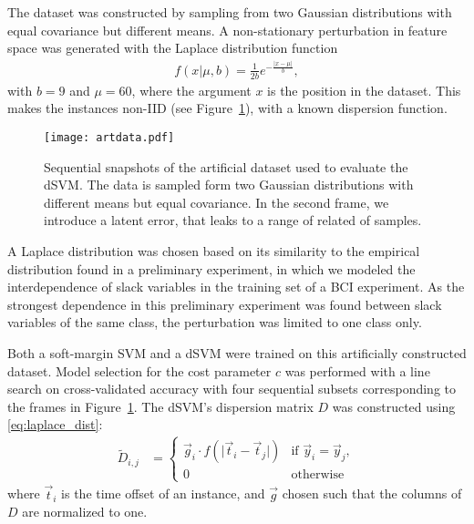 The dataset was constructed by sampling from two Gaussian distributions with
equal covariance but different means. A non-stationary perturbation
in feature space was generated with the Laplace distribution function
\begin{align} \label{eq:laplace_dist}
  f(x \vert \mu, b) = \frac{1}{2b} e^{-\frac{\lvert x - \mu\rvert}{b}},
\end{align}
with $b=9$ and $\mu=60$, where the argument $x$ is the position in the dataset.
This makes the instances non-\ac{IID} (see Figure~\ref{fig:artdata}), with a known dispersion function.

\begin{figure}
  \center
  \texttt{[image: artdata.pdf]}
  \caption{Sequential snapshots of the artificial dataset used to evaluate the
    \protect\ac{dSVM}. The data is sampled form two Gaussian distributions with
    different means but equal covariance. In the second frame, we introduce a
    latent error, that leaks to a range of related of samples.}
  \label{fig:artdata}
\end{figure}

A Laplace distribution was chosen based on its similarity to the empirical
distribution found in a preliminary experiment, in which we modeled the
interdependence of slack variables in the training set of a \ac{BCI}
experiment. As the strongest dependence in this preliminary experiment was
found between slack variables of the same class, the perturbation was limited
to one class only.

\begin{sloppypar}
Both a soft-margin \ac{SVM} and a \ac{dSVM} were trained on this artificially
constructed dataset. Model selection for the cost parameter $c$ was performed
with a line search on cross-validated accuracy with four sequential subsets
corresponding to the frames in Figure~\ref{fig:artdata}. The \ac{dSVM}'s
dispersion matrix $D$ was constructed using \eqref{eq:laplace_dist}:
%
\begin{align} \label{eq:dfunc}
  \tilde{D}_{i,j} &=
    \begin{cases}
      \vec{g}_i \cdot f(\lvert \vec{t}_i - \vec{t}_j \rvert) 
        & \text{if } \vec{y}_i = \vec{y}_j,
    \\
      0 & \text{otherwise}
    \end{cases}
\end{align}
where $\vec{t}_i$ is the time offset of an instance, and $\vec{g}$ chosen such
that the columns of $D$ are normalized to one.
\end{sloppypar}

